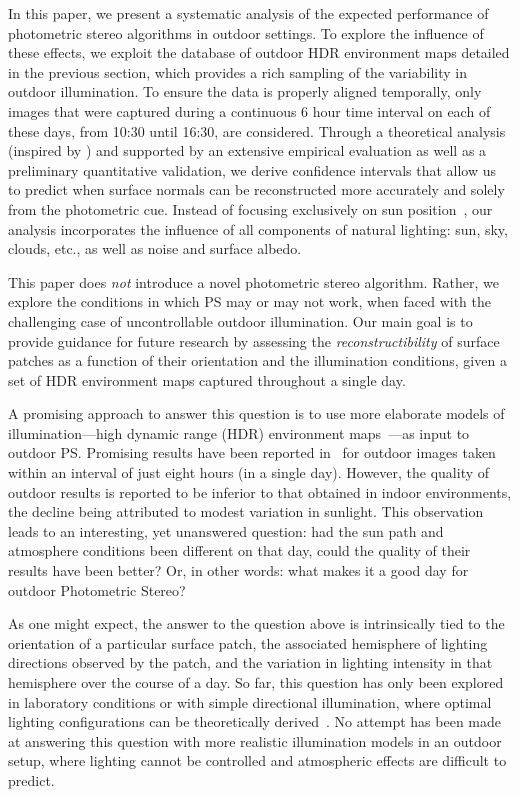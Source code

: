 
In this paper, we present a systematic analysis of the expected performance of photometric stereo algorithms in outdoor settings. To explore the influence of these effects, we exploit the database of outdoor HDR environment maps detailed in the previous section, which provides a rich sampling of the variability in outdoor illumination. To ensure the data is properly aligned temporally, only images that were captured during a continuous 6 hour time interval on each of these days, from 10:30 until 16:30, are considered. Through a theoretical analysis (inspired by \cite{sun-ivc-07}) and supported by an extensive empirical evaluation as well as a preliminary quantitative validation, we derive confidence intervals that allow us to predict when surface normals can be reconstructed more accurately and solely from the photometric cue. Instead of focusing exclusively on sun position~\cite{shen-pg-14}, our analysis incorporates the influence of all components of natural lighting: sun, sky, clouds, etc., as well as noise and surface albedo.

This paper does \emph{not} introduce a novel photometric stereo algorithm. Rather, we explore the conditions in which PS may or may not work, when faced with the challenging case of uncontrollable outdoor illumination. Our main goal is to provide guidance for future research by assessing the \emph{reconstructibility} of surface patches as a function of their orientation and the illumination conditions, given a set of HDR environment maps captured throughout a single day.

A promising approach to answer this question is to use more elaborate models of illumination---high dynamic range (HDR) environment maps~\cite{reinhard-book-05}---as input to outdoor PS. Promising results have been reported in~\cite{yu-iccp-13} for outdoor images taken within an interval of just eight hours (in a single day). However, the quality of outdoor results is reported to be inferior to that obtained in indoor environments, the decline being attributed to modest variation in sunlight. This observation leads to an interesting, yet unanswered question: had the sun path and atmosphere conditions been different on that day, could the quality of their results have been better? Or, in other words: what makes it a good day for outdoor Photometric Stereo?

As one might expect, the answer to the question above is intrinsically tied to the orientation of a particular surface patch, the associated hemisphere of lighting directions observed by the patch, and the variation in lighting intensity in that hemisphere over the course of a day. So far, this question has only been explored in laboratory conditions or with simple directional illumination, where optimal lighting configurations can be theoretically derived~\cite{drbohlav-iccv-05,klaudiny-prl-14,shen-pg-14}. No attempt has been made at answering this question with more realistic illumination models in an outdoor setup, where lighting cannot be controlled and atmospheric effects are difficult to predict.

